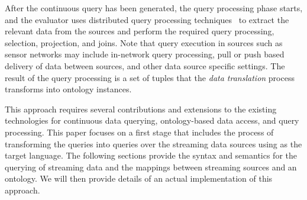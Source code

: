 After the continuous query has been generated, the query processing phase starts, and the evaluator uses distributed query processing techniques~\cite{Kossmann_00} to extract the relevant data from the sources and perform the required query processing, \eg selection, projection, and joins. %
%
Note that query execution in sources such as sensor networks may include in-network query processing, pull or push based delivery of data between sources, and other data source specific settings. The result of the query processing is a set of tuples that the \textit{data translation} process transforms into ontology instances.

This approach requires several contributions and extensions to the existing technologies for continuous data querying, ontology-based data access, and \sparql query processing. This paper focuses on a first stage that includes the process of transforming the \sparqlstr queries into queries over the streaming data sources using \sneeql as the target language. The following sections provide the syntax and semantics for the querying of streaming \rdf data and the mappings between streaming sources and an ontology. We will then provide details of an actual implementation of this approach.

